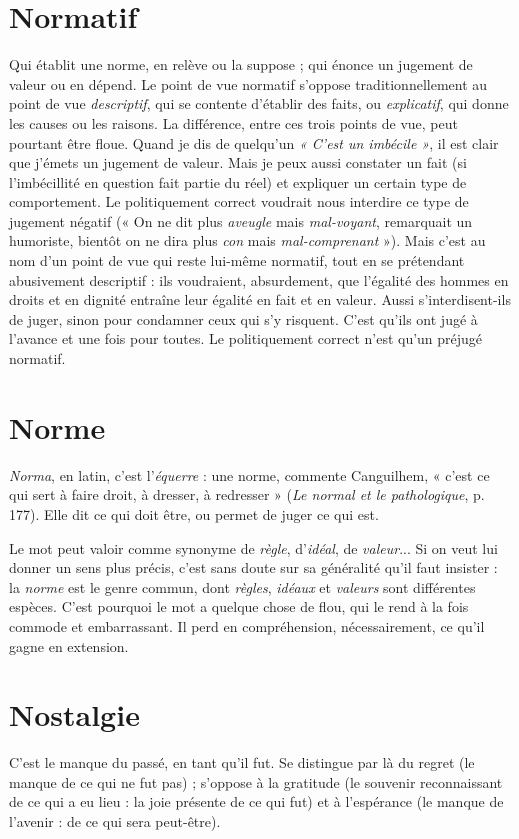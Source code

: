 \section{Normatif}
Qui établit une norme, en relève ou la suppose ; qui énonce
un jugement de valeur ou en dépend. Le point de vue normatif
s'oppose traditionnellement au point de vue {\it descriptif}, qui se contente d'établir
des faits, ou {\it explicatif}, qui donne les causes ou les raisons. La différence, entre
ces trois points de vue, peut pourtant être floue. Quand je dis de quelqu'un
{\it « C'est un imbécile »}, il est clair que j’émets un jugement de valeur. Mais je peux
aussi constater un fait (si l’imbécillité en question fait partie du réel) et expliquer
un certain type de comportement. Le politiquement correct voudrait nous
interdire ce type de jugement négatif (« On ne dit plus {\it aveugle} mais {\it mal-voyant},
remarquait un humoriste, bientôt on ne dira plus {\it con} mais {\it mal-comprenant} »).
Mais c'est au nom d’un point de vue qui reste lui-même normatif, tout en se
prétendant abusivement descriptif : ils voudraient, absurdement, que l'égalité
des hommes en droits et en dignité entraîne leur égalité en fait et en valeur.
Aussi s’interdisent-ils de juger, sinon pour condamner ceux qui s’y risquent.
C’est qu'ils ont jugé à l’avance et une fois pour toutes. Le politiquement correct
n'est qu'un préjugé normatif.

\section{Norme}
{\it Norma}, en latin, c’est l’{\it équerre} : une norme, commente Canguilhem,
« c’est ce qui sert à faire droit, à dresser, à redresser » ({\it Le
normal et le pathologique}, p. 177). Elle dit ce qui doit être, ou permet de juger
ce qui est.

Le mot peut valoir comme synonyme de {\it règle}, d’{\it idéal}, de {\it valeur}... Si on
veut lui donner un sens plus précis, c’est sans doute sur sa généralité qu’il faut
insister : la {\it norme} est le genre commun, dont {\it règles}, {\it idéaux} et {\it valeurs} sont différentes
espèces. C’est pourquoi le mot a quelque chose de flou, qui le rend à la
fois commode et embarrassant. Il perd en compréhension, nécessairement, ce
qu’il gagne en extension.

\section{Nostalgie}
C’est le manque du passé, en tant qu’il fut. Se distingue par là
du regret (le manque de ce qui ne fut pas) ; s'oppose à la gratitude
(le souvenir reconnaissant de ce qui a eu lieu : la joie présente de ce qui
fut) et à l'espérance (le manque de l’avenir : de ce qui sera peut-être).

